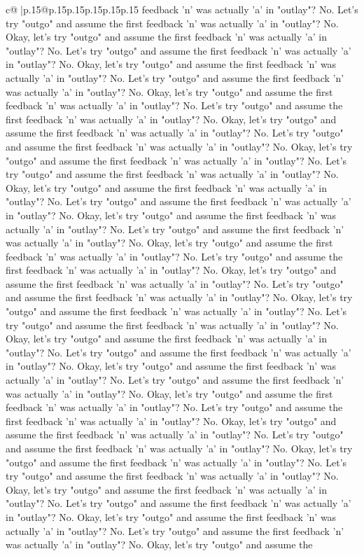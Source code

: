 \documentclass{article}
\begin{document}
{\begin{supertabular}{c@{$\;$}|p{.15\linewidth}@{}p{.15\linewidth}p{.15\linewidth}p{.15\linewidth}p{.15\linewidth}p{.15\linewidth}}
{{{feedback 'n' was actually 'a' in "outlay"? No. Let's try "outgo" and assume the first feedback 'n' was actually 'a' in "outlay"? No. Okay, let's try "outgo" and assume the first feedback 'n' was actually 'a' in "outlay"? No. Let's try "outgo" and assume the first feedback 'n' was actually 'a' in "outlay"? No. Okay, let's try "outgo" and assume the first feedback 'n' was actually 'a' in "outlay"? No. Let's try "outgo" and assume the first feedback 'n' was actually 'a' in "outlay"? No. Okay, let's try "outgo" and assume the first feedback 'n' was actually 'a' in "outlay"? No. Let's try "outgo" and assume the first feedback 'n' was actually 'a' in "outlay"? No. Okay, let's try "outgo" and assume the first feedback 'n' was actually 'a' in "outlay"? No. Let's try "outgo" and assume the first feedback 'n' was actually 'a' in "outlay"? No. Okay, let's try "outgo" and assume the first feedback 'n' was actually 'a' in "outlay"? No. Let's try "outgo" and assume the first feedback 'n' was actually 'a' in "outlay"? No. Okay, let's try "outgo" and assume the first feedback 'n' was actually 'a' in "outlay"? No. Let's try "outgo" and assume the first feedback 'n' was actually 'a' in "outlay"? No. Okay, let's try "outgo" and assume the first feedback 'n' was actually 'a' in "outlay"? No. Let's try "outgo" and assume the first feedback 'n' was actually 'a' in "outlay"? No. Okay, let's try "outgo" and assume the first feedback 'n' was actually 'a' in "outlay"? No. Let's try "outgo" and assume the first feedback 'n' was actually 'a' in "outlay"? No. Okay, let's try "outgo" and assume the first feedback 'n' was actually 'a' in "outlay"? No. Let's try "outgo" and assume the first feedback 'n' was actually 'a' in "outlay"? No. Okay, let's try "outgo" and assume the first feedback 'n' was actually 'a' in "outlay"? No. Let's try "outgo" and assume the first feedback 'n' was actually 'a' in "outlay"? No. Okay, let's try "outgo" and assume the first feedback 'n' was actually 'a' in "outlay"? No. Let's try "outgo" and assume the first feedback 'n' was actually 'a' in "outlay"? No. Okay, let's try "outgo" and assume the first feedback 'n' was actually 'a' in "outlay"? No. Let's try "outgo" and assume the first feedback 'n' was actually 'a' in "outlay"? No. Okay, let's try "outgo" and assume the first feedback 'n' was actually 'a' in "outlay"? No. Let's try "outgo" and assume the first feedback 'n' was actually 'a' in "outlay"? No. Okay, let's try "outgo" and assume the first feedback 'n' was actually 'a' in "outlay"? No. Let's try "outgo" and assume the first feedback 'n' was actually 'a' in "outlay"? No. Okay, let's try "outgo" and assume the first feedback 'n' was actually 'a' in "outlay"? No. Let's try "outgo" and assume the first feedback 'n' was actually 'a' in "outlay"? No. Okay, let's try "outgo" and assume the first feedback 'n' was actually 'a' in "outlay"? No. Let's try "outgo" and assume the first feedback 'n' was actually 'a' in "outlay"? No. Okay, let's try "outgo" and assume the first feedback 'n' was actually 'a' in "outlay"? No. Let's try "outgo" and assume the first feedback 'n' was actually 'a' in "outlay"? No. Okay, let's try "outgo" and assume the }}}
\end{supertabular}}
\end{document}
